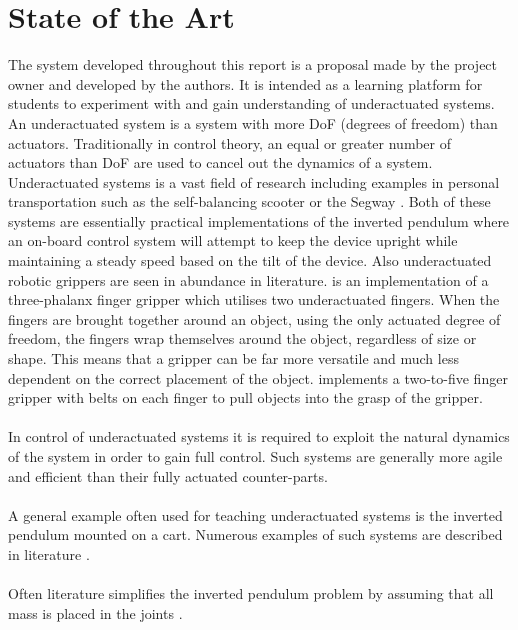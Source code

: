 \section{State of the Art}

The system developed throughout this report is a proposal made by the project owner and developed by the authors.
It is intended as a learning platform for students to experiment with and gain understanding of underactuated systems.
An underactuated system is a system with more DoF (degrees of freedom) than actuators.
Traditionally in control theory, an equal or greater number of actuators than DoF are used to cancel out the dynamics of a system.
Underactuated systems is a vast field of research including examples in personal transportation such as the self-balancing scooter \cite{scooter} or the Segway \cite{segway}.
Both of these systems are essentially practical implementations of the inverted pendulum where an on-board control system will attempt to keep the device upright while maintaining a steady speed based on the tilt of the device.
Also underactuated robotic grippers are seen in abundance in literature. 
\cite{threegripper} is an implementation of a three-phalanx finger gripper which utilises two underactuated fingers.
When the fingers are brought together around an object, using the only actuated degree of freedom, the fingers wrap themselves around the object, regardless of size or shape.
This means that a gripper can be far more versatile and much less dependent on the correct placement of the object. 
\cite{pullgripper} implements a two-to-five finger gripper with belts on each finger to pull objects into the grasp of the gripper.
\\~\\
In control of underactuated systems it is required to exploit the natural dynamics of the system \cite{mitunderactuated} in order to gain full control.
Such systems are generally more agile and efficient than their fully actuated counter-parts.
\\~\\
A general example often used for teaching underactuated systems is the inverted pendulum mounted on a cart.
Numerous examples of such systems are described in literature \cite{invertpendulum1} \cite{tripleinvertpendulum} \cite{invertpendulum3} \cite{doubleinvertpendulum}.
\\~\\
Often literature simplifies the inverted pendulum problem by assuming that all mass is placed in the joints \cite{doubleinvertpendulum}.


